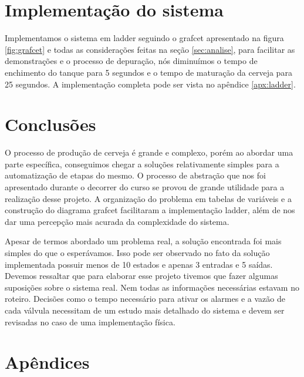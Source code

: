 \documentclass[twoside,twocolumn,12pt]{paper}
\begin{document}
\section {Implementação do sistema}
\label{sec:ladder}
Implementamos o sistema em ladder seguindo o grafcet apresentado na figura \ref{fig:grafcet} e todas as considerações feitas na seção \ref{sec:analise}, para facilitar as demonstrações e o processo de depuração, nós diminuímos o tempo de enchimento do tanque para 5 segundos e o tempo de maturação da cerveja para 25 segundos. A implementação completa pode ser vista no apêndice \ref{apx:ladder}.

\section {Conclusões}
O processo de produção de cerveja é grande e complexo, porém ao abordar uma parte específica, conseguimos chegar a soluções relativamente simples para a automatização de etapas do mesmo. O processo de abstração que nos foi apresentado durante o decorrer do curso se provou de grande utilidade para a realização desse projeto. A organização do problema em tabelas de variáveis e a construção do diagrama grafcet facilitaram a implementação ladder, além de nos dar uma percepção mais acurada da complexidade do sistema.

Apesar de termos abordado um problema real, a solução encontrada foi mais simples do que o esperávamos. Isso pode ser observado no fato da solução implementada possuir menos de 10 estados e apenas 3 entradas e 5 saídas. Devemos ressaltar que para elaborar esse projeto tivemos que fazer algumas suposições sobre o sistema real. Nem todas as informações necessárias estavam no roteiro. Decisões como o tempo necessário para ativar os alarmes e a vazão de cada válvula necessitam de um estudo mais detalhado do sistema e devem ser revisadas no caso de uma implementação física.
\newpage
\clearpage
\appendix
\section{Apêndices}

\label{apx:table}


\label{apx:ladder}


\label{apx:ihm}


\end{document}
